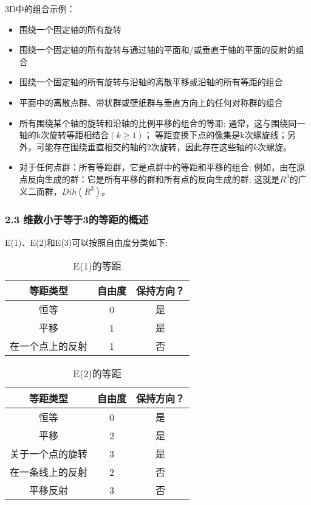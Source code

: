 3D中的组合示例：

\begin{itemize}
\item 围绕一个固定轴的所有旋转
\item 围绕一个固定轴的所有旋转与通过轴的平面和/或垂直于轴的平面的反射的组合
\item 围绕一个固定轴的所有旋转与沿轴的离散平移或沿轴的所有等距的组合
\item 平面中的离散点群、带状群或壁纸群与垂直方向上的任何对称群的组合
\item 所有围绕某个轴的旋转和沿轴的比例平移的组合的等距; 通常，这与围绕同一轴的k次旋转等距相结合$(k \geq 1)$； 等距变换下点的像集是k次螺旋线；另外，可能存在围绕垂直相交的轴的2次旋转，因此存在这些轴的$k$次螺旋。
\item 对于任何点群：所有等距群，它是点群中的等距和平移的组合; 例如，由在原点反向生成的群：它是所有平移的群和所有点的反向生成的群; 这就是$R^3$的广义二面群，$Dih(R^3)$。
\end{itemize}

\subsubsection{2.3 维数小于等于3的等距的概述}

E(1)、E(2)和E(3)可以按照自由度分类如下:

\begin{table}[ht]
\centering
\caption{E(1)的等距}\label{tab_OJLDQ}
\begin{tabular}{|c|c|c}
\hline
\textbf{等距类型} & \textbf{自由度} & \textbf{保持方向？} \\
\hline
恒等 & 0 & 是 \\
\hline
平移 & 1 & 是 \\
\hline
在一个点上的反射 & 1 & 否 \\
\hline
\end{tabular}
\end{table}

\begin{table}[ht]
\centering
\caption{E(2)的等距}\label{tab_OJLDQ_1}
\begin{tabular}{|c|c|c}
\hline
\textbf{等距类型} & \textbf{自由度} & \textbf{保持方向？} \\
\hline
恒等 & 0 & 是 \\
\hline
平移 & 2 & 是\\
\hline
关于一个点的旋转 & 3 & 是 \\
\hline
在一条线上的反射 & 2 & 否 \\
\hline
平移反射 & 3 & 否 \\
\hline
\end{tabular}
\end{table}

